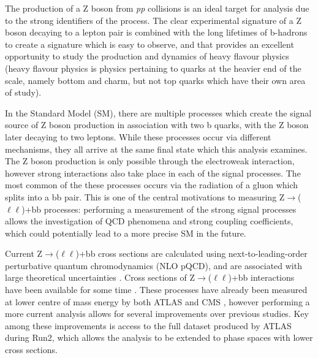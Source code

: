 \documentclass[12pt,a4paper,epsf,portrait,times,epsfig]{report}
\begin{document}
	The production of a Z boson from \textit{pp} collisions is an ideal target for analysis due to the strong identifiers of the process. The clear experimental signature of a Z boson decaying to a lepton pair is combined with the long lifetimes of b-hadrons to create a signature which is easy to observe, and that provides an excellent opportunity to study the production and dynamics of heavy flavour physics (heavy flavour physics is physics pertaining to quarks at the heavier end of the scale, namely bottom and charm, but not top quarks which have their own area of study). \par
	
	In the Standard Model (SM), there are multiple processes which create the signal source of Z boson production in association with two b quarks, with the Z boson later decaying to two leptons. While these processes occur via different mechanisms, they all arrive at the same final state which this analysis examines. The Z boson production is only possible through the electroweak interaction, however strong interactions also take place in each of the signal processes. The most common of the these processes occurs via the radiation of a gluon which splits into a bb pair. This is one of the central motivations to measuring Z$\rightarrow$($\ell\ell$)+bb processes: performing a measurement of the strong signal processes allows the investigation of QCD phenomena and strong coupling coefficients, which could potentially lead to a more precise SM in the future. \par
	
	Current Z$\rightarrow$($\ell\ell$)+bb cross sections are calculated using next-to-leading-order perturbative quantum chromodynamics (NLO pQCD), and are associated with large theoretical uncertainties \cite{Article:EarlyQCDCrossSections}. Cross sections of Z$\rightarrow$($\ell\ell$)+bb interactions have been available for some time \cite{Article:HeavyFlavourXsec1, Article:HeavyFlavourXsec2, Article:HeavyFlavourXsec3}. These processes have already been measured at lower centre of mass energy by both ATLAS \cite{Article:EarlyATLASCrossSecMeasurement}
	and CMS \cite{Article:EarlyCMSCrossSecMeasurement}, however performing a more current analysis allows for several improvements over previous studies. Key among these improvements is access to the full dataset produced by ATLAS during Run2, which allows the analysis to be extended to phase spaces with lower cross sections. \par
	

	
\end{document}
